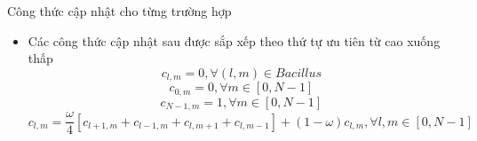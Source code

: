 \begin{frame}{Công thức cập nhật cho từng trường hợp}
\begin{itemize}
	\item Các công thức cập nhật sau được sắp xếp theo thứ tự ưu tiên từ cao xuống thấp
	\begin{equation}
		c_{l, m} = 0, \forall (l, m) \in Bacillus
	\end{equation}
	\begin{equation}
		c_{0, m} = 0, \forall m \in [0, N - 1]
	\end{equation}
	\begin{equation}
		c_{N - 1, m} = 1, \forall m \in [0, N - 1]
	\end{equation}
    \begin{equation}
    	c_{l, m} = \frac{\omega}{4}[c_{l + 1, m} + c_{l - 1, m} + c_{l, m + 1} + c_{l, m - 1}] + (1 - \omega)c_{l, m}, \forall l, m \in [0, N - 1]
    \end{equation}
\end{itemize}
\end{frame}